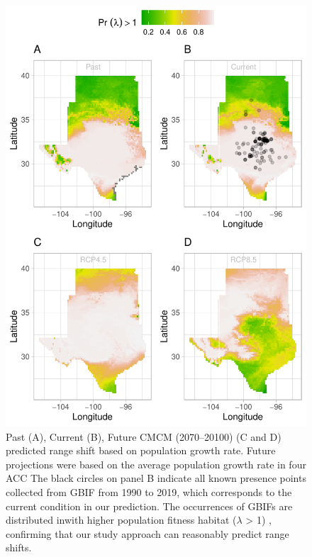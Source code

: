\documentclass[12pt]{article}
\begin{document}
\begin{figure}[H]
  \begin{center}
    \includegraphics[width=0.78\linewidth]{Figures/Fig_geoPrlambdaprojection_acc.pdf}
  \caption{Past (A), Current (B), Future CMCM (2070–20100) (C and D) predicted range shift based on population growth rate. Future projections were based on the average population growth rate in four ACC The black circles on panel B indicate all known presence points collected from GBIF from 1990 to 2019, which corresponds to the current condition in our prediction.  The occurrences of GBIFs are distributed inwith higher population fitness habitat ($\lambda$ > 1) , confirming that our study approach can reasonably predict range shifts. }
  \label{Sup:geoprojacc}
  \end{center}
\end{figure}
\end{document}
